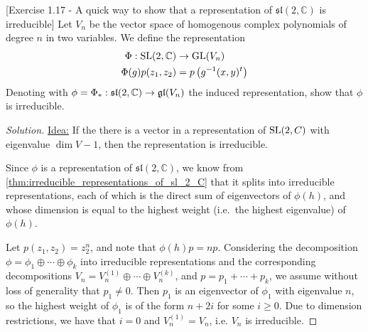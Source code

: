 \documentclass{report}
\begin{document}
\begin{exercise}\label{ex:sl_2_C_irreducible}
[Exercise 1.17 - A quick way to show that a representation of $\mathfrak{sl}(2,\mathbb C)$ is irreducible]
Let $V_n$ be the vector space of homogenous complex polynomials of degree $n$ in two variables.
We define the representation
\begin{align*}
    \Phi: \operatorname{{\mathrm{SL}}}(2,\mathbb C) &\to \operatorname{{\mathrm{GL}}}(V_n)\\
    \Phi(g)p(z_1, z_2) &= p \left( g^{-1}(x,y)^t \right)
\end{align*}    
Denoting with $\phi = \Phi_*: \mathfrak{sl}(2,\mathbb C) \to \operatorname{{\mathfrak{gl}}}(V_n)$ the induced representation, show that $\phi$ is irreducible.
\end{exercise}
\begin{proof}[Solution]
    \underline{Idea:} If the there is a vector in a representation of $\operatorname{{\mathrm{SL}}}(2, C)$ with eigenvalue $\dim V - 1$, then the representation is irreducible.

    Since $\phi$ is a representation of $\mathfrak{sl}(2,\mathbb C)$, we know from \cref{thm:irreducible_representations_of_sl_2_C} that it splits into irreducible representations, each of which is the direct sum of eigenvectors of $\phi(h)$, and whose dimension is equal to the highest weight (i.e.\ the highest eigenvalue) of $\phi(h)$.

    Let $p(z_1,z_2) = z_2^n$, and note that $\phi(h)p = n p$.
    Considering the decomposition $\phi = \phi_1 \oplus \cdots \oplus \phi_k$ into irreducible representations and the corresponding decompositions $V_n = V_n^{(1)} \oplus \cdots \oplus V_n^{(k)}$, and $p = p_1 + \cdots + p_k$, we assume without loss of generality that $p_1 \neq 0$.
    Then $p_1$ is an eigenvector of $\phi_1$ with eigenvalue $n$, so the highest weight of $\phi_1$ is of the form $n + 2i$ for some $i \geq 0$.
    Due to dimension restrictions, we have that $i = 0$ and $V_n^{(1)} = V_n$, i.e. $V_n$ is irreducible.
\end{proof}
\end{document}
